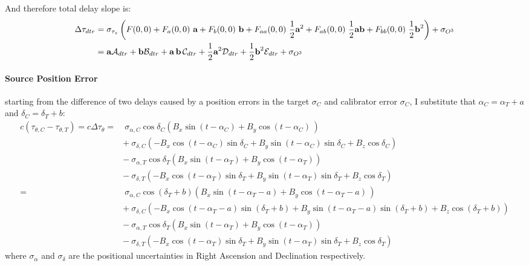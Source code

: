 	And therefore total delay slope is:
	\begin{align*}
		\Delta\tau_{dtr} &= \sigma_{\tau_z}\left(F(0,0) + F_a(0,0)~\textbf{a} + F_b(0,0)~\textbf{b} + F_{aa}(0,0)~\frac{1}{2}\textbf{a}^2 +  F_{ab}(0,0)~\frac{1}{2}\textbf{ab} +  F_{bb}(0,0)~\frac{1}{2}\textbf{b}^2\right)  + \sigma_{O^3} \\
						 &=\textbf{a}\mathcal{A}_{dtr} + \textbf{b}\mathcal{B}_{dtr} + \textbf{a\,b}\,\mathcal{C}_{dtr} + \frac{1}{2}\textbf{a}^2\mathcal{D}_{dtr} + \frac{1}{2}\textbf{b}^2\mathcal{E}_{dtr} + \sigma_{O^3}
	\end{align*}
	
	\paragraph{Source Position Error} \label{app:sourceposerror} starting from the difference of two delays caused by a position errors in the target $\sigma_C$ and calibrator error $\sigma_C$, I substitute that $\alpha_C = \alpha_T+a$ and $\delta_C=\delta_T+b$:
	\begin{equation*}
		\begin{split}
		c\left(\tau_{\theta,C}-\tau_{\theta,T}\right)= c\Delta\tau_\theta =&~\sigma_{\alpha,C}\cos\delta_C(B_x\sin(t-\alpha_C)+B_y\cos(t-\alpha_C)\,)\\
		&+~\sigma_{\delta,C}(-B_x\cos(t-\alpha_C)\sin\delta_C+B_y\sin(t-\alpha_C)\sin\delta_C+B_z\cos\delta_C) \\
		&-~\sigma_{\alpha,T}\cos\delta_T\left(B_x\sin(t-\alpha_T)+B_y\cos(t-\alpha_T)\right)\\
		&-~\sigma_{\delta,T}\left(-B_x\cos(t-\alpha_T)\sin\delta_T+B_y\sin(t-\alpha_T)\sin\delta_T+B_z\cos\delta_T\right)\\
			=&~\sigma_{\alpha,C}\cos\left(\delta_T+b\right)(B_x\sin(t-\alpha_T-a)+B_y\cos(t-\alpha_T-a)\,)\\
			&+~\sigma_{\delta,C}(-B_x\cos(t-\alpha_T-a)\sin\left(\delta_T+b\right)+B_y\sin(t-\alpha_T-a)\sin\left(\delta_T+b\right)+B_z\cos\left(\delta_T+b\right)) \\
			&-~\sigma_{\alpha,T}\cos\delta_T\left(B_x\sin(t-\alpha_T)+B_y\cos(t-\alpha_T)\right)\\
			&-~\sigma_{\delta,T}\left(-B_x\cos(t-\alpha_T)\sin\delta_T+B_y\sin(t-\alpha_T)\sin\delta_T+B_z\cos\delta_T\right)
		\end{split}
	\end{equation*} where $\sigma_\alpha$ and $\sigma_\delta$ are the positional uncertainties in Right Ascension and Declination respectively.
	
